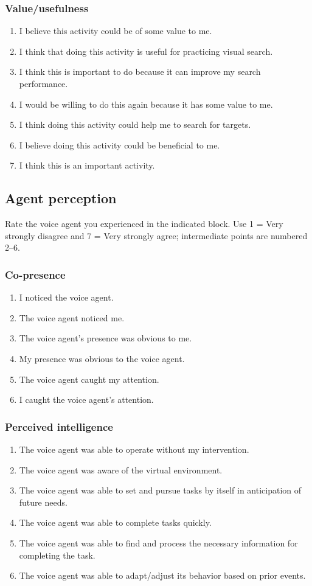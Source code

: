 \documentclass[11pt,letterpaper]{article}
\begin{document}
\subsubsection*{Value/usefulness}\label{imi4}
\begin{enumerate}
\item I believe this activity could be of some value to me.
\item I think that doing this activity is useful for practicing visual search.
\item I think this is important to do because it can improve my search performance.
\item I would be willing to do this again because it has some value to me.
\item I think doing this activity could help me to search for targets.
\item I believe doing this activity could be beneficial to me.
\item I think this is an important activity.
\end{enumerate}
\subsection{Agent perception}
Rate the voice agent you experienced in the indicated block. Use 1 = Very strongly disagree and 7 = Very strongly agree; intermediate points are numbered 2--6.
\subsubsection*{Co-presence}
\begin{enumerate}
\item[Q1.] I noticed the voice agent.
\item[Q2.] The voice agent noticed me.
\item[Q3.] The voice agent's presence was obvious to me.
\item[Q4.] My presence was obvious to the voice agent.
\item[Q5.] The voice agent caught my attention.
\item[Q6.] I caught the voice agent's attention.
\end{enumerate}
\subsubsection*{Perceived intelligence}
\begin{enumerate}
\item[Q13.] The voice agent was able to operate without my intervention.
\item[Q14.] The voice agent was aware of the virtual environment.
\item[Q15.] The voice agent was able to set and pursue tasks by itself in anticipation of future needs.
\item[Q16.] The voice agent was able to complete tasks quickly.
\item[Q17.] The voice agent was able to find and process the necessary information for completing the task.
\item[Q18.] The voice agent was able to adapt/adjust its behavior based on prior events.
\end{enumerate}
\end{document}
